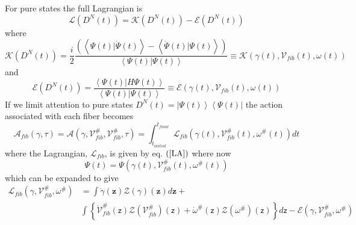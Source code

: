 \documentclass[aps,preprint]{revtex4}%
\begin{document}
For pure states the full Lagrangian is
\begin{equation}
\mathcal{L}\left(  D^{N}\left(  t\right)  \right)  =\mathcal{K}\left(
D^{N}\left(  t\right)  \right)  -\mathcal{E}\left(  D^{N}\left(  t\right)
\right)  \label{LA}%
\end{equation}
where
\begin{equation}
\mathcal{K}\left(  D^{N}\left(  t\right)  \right)  =\frac{i}{2}\frac{\left(
\left\langle \Psi\left(  t\right)  |\dot{\Psi}\left(  t\right)  \right\rangle
-\left\langle \dot{\Psi}\left(  t\right)  |\Psi\left(  t\right)  \right\rangle
\right)  }{\left\langle \Psi\left(  t\right)  |\Psi\left(  t\right)
\right\rangle }\equiv\mathcal{K}\left(  \gamma\left(  t\right)  ,\mathcal{V}%
_{fib}\left(  t\right)  ,\omega\left(  t\right)  \right)
\end{equation}
and
\begin{equation}
\mathcal{E}\left(  D^{N}\left(  t\right)  \right)  =\frac{\left\langle
\Psi\left(  t\right)  |H\Psi\left(  t\right)  \right\rangle }{\left\langle
\Psi\left(  t\right)  |\Psi\left(  t\right)  \right\rangle }\equiv
\mathcal{E}\left(  \gamma\left(  t\right)  ,\mathcal{V}_{fib}\left(  t\right)
,\omega\left(  t\right)  \right)
\end{equation}
If we limit attention to pure states $D^{N}\left(  t\right)  =\left|
\Psi\left(  t\right)  \right\rangle \left\langle \Psi\left(  t\right)
\right|  $ the action associated with each fiber becomes
\begin{equation}
\mathcal{A}_{fib}\left(  \gamma,\tau\right)  =\mathcal{A}\left(
\gamma,\mathcal{V}_{fib}^{\#},\mathcal{V}_{fib}^{\#},\tau\right)
=\int_{t_{initial}}^{t_{final}}\mathcal{L}_{fib}\left(  \gamma\left(
t\right)  ,\mathcal{V}_{fib}^{\#}\left(  t\right)  ,\omega^{\#}\left(
t\right)  \right)  dt \label{fact}%
\end{equation}
where the Lagrangian, $\mathcal{L}_{fib}$, is given by eq. $\left(
\ref{LA}\right)  $ where now
\begin{equation}
\Psi\left(  t\right)  =\Psi\left(  \gamma\left(  t\right)  ,\mathcal{V}%
_{fib}^{\#}\left(  t\right)  ,\omega^{\#}\left(  t\right)  \right)
\end{equation}
which can be expanded to give
\begin{align}
\mathcal{L}_{fib}\left(  \gamma,\mathcal{V}_{fib}^{\#},\omega^{\#}\right)   &
=\int\mathcal{\dot{\gamma}}\left(  \mathbf{z}\right)  \mathcal{Z}\left(
\mathcal{\gamma}\right)  \left(  \mathbf{z}\right)  d\mathbf{z+}\nonumber\\
&  \int\left\{  \mathcal{\dot{V}}_{fib}^{\#}\left(  \mathsf{z}\right)
\mathcal{Z}\left(  \mathcal{V}_{fib}^{\#}\right)  \left(  \mathsf{z}\right)
+\mathcal{\dot{\omega}}^{\#}\left(  \mathsf{z}\right)  \mathcal{Z}\left(
\mathcal{\omega}^{\#}\right)  \left(  \mathsf{z}\right)  \right\}
d\mathsf{z}-\mathcal{E}\left(  \gamma,\mathcal{V}_{fib}^{\#},\mathcal{\omega
}^{\#}\right)
\end{align}
\end{document}
